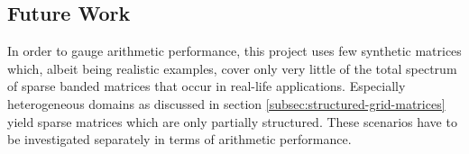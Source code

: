 \documentclass{article}
\begin{document}
  \subsection{Future Work}

    In order to gauge arithmetic performance, this project uses few synthetic matrices which, albeit being realistic examples, cover only very little of the total spectrum of sparse banded matrices that occur in real-life applications. Especially heterogeneous domains as discussed in section \ref{subsec:structured-grid-matrices} yield sparse matrices which are only partially structured. These scenarios have to be investigated separately in terms of arithmetic performance.

\printbibliography
\end{document}
